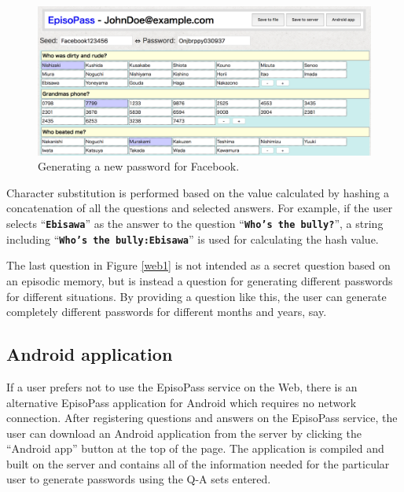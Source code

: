 \documentclass[runningheads,a4paper]{llncs}
\begin{document}
\begin{figure}
  \centering
  \includegraphics[width=1.0\columnwidth]{figures/ab4517dd593c1cabab5fecef546f7e88}
  \caption{Generating a new password for Facebook.}
  \label{web2}
\end{figure}

Character substitution is performed based on the value
calculated by hashing a concatenation of all the questions and selected answers.
%
For example, if the user selects ``\textbf{\texttt{Ebisawa}}''
as the answer to the question ``\textbf{\texttt{Who's the bully?}}'',
a string including ``\textbf{\texttt{Who's the bully:Ebisawa}}''
is used for calculating the hash value.

The last question in Figure \ref{web1} is not intended as a secret question based on an
episodic memory, but is instead a question
for generating different passwords for different situations.
By providing a question like this, the user can generate completely different passwords
for different months and years, say.

\subsection{Android application}

If a user prefers not to use the EpisoPass service on the Web,
there is an alternative EpisoPass application for Android
which requires no network connection.
After registering questions and answers on the EpisoPass service,
the user can download an Android application from the server
by clicking the ``Android app'' button at the top of the page.
The application is compiled and built on the server and contains
all of the information needed for the particular user to
generate passwords using the Q-A sets entered.
\end{document}
